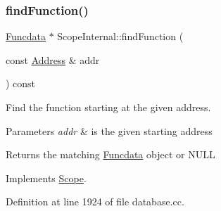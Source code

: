 \subsubsection{\texorpdfstring{findFunction()}{findFunction()}}
{\footnotesize\ttfamily \mbox{\hyperlink{class_funcdata}{Funcdata}} $\ast$ Scope\+Internal\+::find\+Function (\begin{DoxyParamCaption}\item[{const \mbox{\hyperlink{class_address}{Address}} \&}]{addr }\end{DoxyParamCaption}) const\hspace{0.3cm}{\ttfamily [virtual]}}



Find the function starting at the given address. 


\begin{DoxyParams}{Parameters}
{\em addr} & is the given starting address \\
\hline
\end{DoxyParams}
\begin{DoxyReturn}{Returns}
the matching \mbox{\hyperlink{class_funcdata}{Funcdata}} object or N\+U\+LL 
\end{DoxyReturn}


Implements \mbox{\hyperlink{class_scope_a2c621196f6fdb4b8ce4ee1f3dc953107}{Scope}}.



Definition at line 1924 of file database.\+cc.

